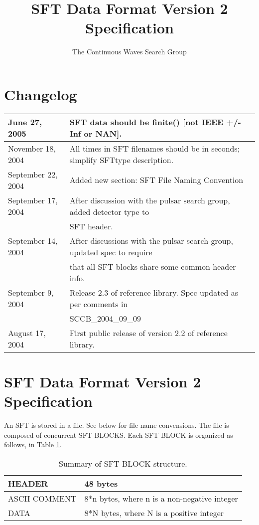 \documentclass{ligodcc}
\title{SFT Data Format Version 2 Specification}
\author{The Continuous Waves Search Group}
\begin{document}
\maketitle

\section{Changelog}


\begin{table}[ht]
\centering
\begin{tabular}{|l|l|}
\hline
June 27, 2005     & SFT data should be finite() [not IEEE +/- Inf or NAN].\\
\hline
November 18, 2004 & All times in SFT filenames should be in seconds; simplify SFTtype description. \\
\hline
September 22, 2004 & Added new section: SFT File Naming Convention \\
\hline
September 17, 2004 & After discussion with the pulsar search group, added detector type to\\
   & SFT header. \\
\hline
September 14, 2004 & After discussions with the pulsar search group, updated spec to require\\
   & that all SFT blocks share some common header info. \\
\hline
September 9, 2004 & Release 2.3 of reference library.  Spec updated as per comments in\\
   & SCCB\_2004\_09\_09 \\
\hline
August 17, 2004  & First public release of version 2.2 of reference library. \\
\hline
\end{tabular}
\end{table}
 
\section{SFT Data Format Version 2 Specification}

An SFT is stored in a file. See below for file name convensions. The
file is composed of concurrent SFT BLOCKS. Each SFT BLOCK is organized as follows,
in Table \ref{tab:summary_struct}.

\begin{table}[ht]
\centering
\begin{tabular}{|l|l|}
\hline
   HEADER & 48 bytes\\
\hline

 ASCII COMMENT & 8*n bytes,
 where n is a non-negative
 integer\\
\hline

  DATA & 8*N bytes,
 where N is a positive
 integer\\
\hline
\end{tabular}
\caption{Summary of SFT BLOCK structure.}
\label{tab:summary_struct}
\end{table}
\end{document}
